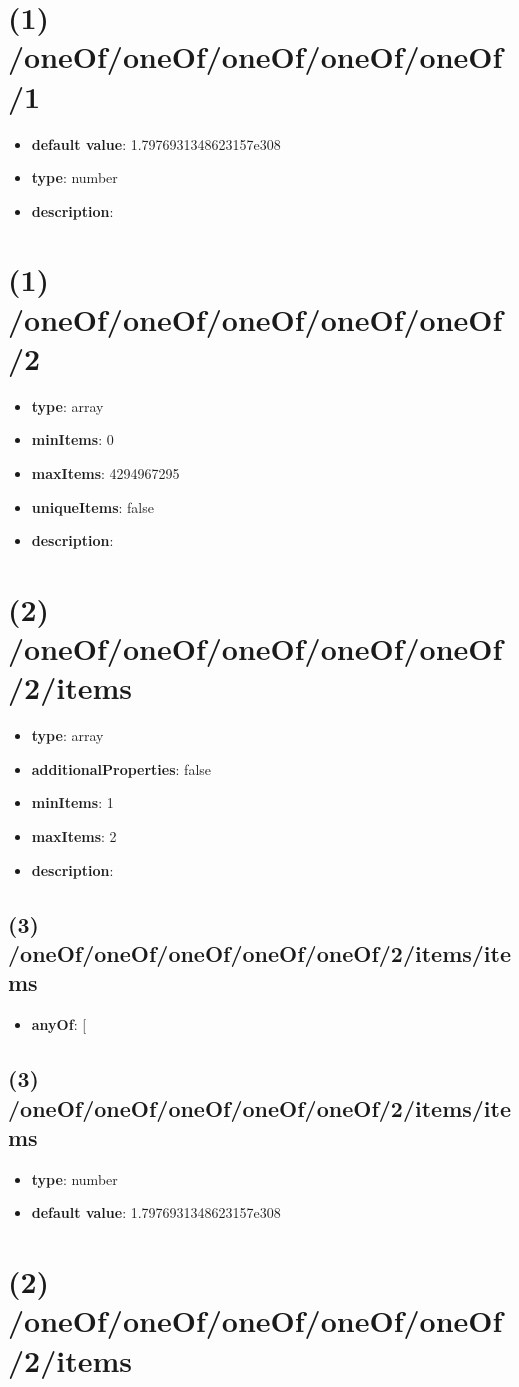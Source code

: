 \section{(1) /oneOf/oneOf/oneOf/oneOf/oneOf/1}
\begin{itemize}[leftmargin=1em]\item {\bf default value}: 1.7976931348623157e308
\item {\bf type}: number
\item {\bf description}: 
\end{itemize}\section{(1) /oneOf/oneOf/oneOf/oneOf/oneOf/2}
\begin{itemize}[leftmargin=1em]\item {\bf type}: array
\item {\bf minItems}: 0
\item {\bf maxItems}: 4294967295
\item {\bf uniqueItems}: false
\item {\bf description}: 
\end{itemize}\section{(2) /oneOf/oneOf/oneOf/oneOf/oneOf/2/items}
\begin{itemize}[leftmargin=2em]\item {\bf type}: array
\item {\bf additionalProperties}: false
\item {\bf minItems}: 1
\item {\bf maxItems}: 2
\item {\bf description}: 
\end{itemize}\subsection{(3) /oneOf/oneOf/oneOf/oneOf/oneOf/2/items/items}
\begin{itemize}[leftmargin=3em]\item {\bf anyOf}: [\end{itemize}\subsection{(3) /oneOf/oneOf/oneOf/oneOf/oneOf/2/items/items}
\begin{itemize}[leftmargin=3em]\item {\bf type}: number\item {\bf default value}: 1.7976931348623157e308
\end{itemize}\section{(2) /oneOf/oneOf/oneOf/oneOf/oneOf/2/items}
